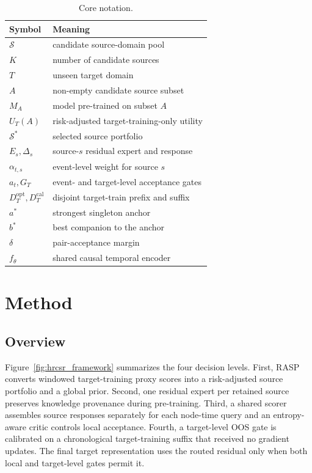 \documentclass[journal]{IEEEtran}
\begin{document}
\begin{table}[t]
\centering
\caption{Core notation.}
\label{tab:notation}
\small
\begin{tabular*}{\linewidth}{@{\extracolsep{\fill}}ll}
\toprule
Symbol & Meaning \\
\midrule
$\mathcal S$ & candidate source-domain pool \\
$K$ & number of candidate sources \\
$T$ & unseen target domain \\
$A$ & non-empty candidate source subset \\
$M_A$ & model pre-trained on subset $A$ \\
$U_T(A)$ & risk-adjusted target-training-only utility \\
$\mathcal S^*$ & selected source portfolio \\
$E_s,\Delta_s$ & source-$s$ residual expert and response \\
$\alpha_{t,s}$ & event-level weight for source $s$ \\
$a_t,G_T$ & event- and target-level acceptance gates \\
$D_T^{\mathrm{opt}},D_T^{\mathrm{cal}}$ & disjoint target-train prefix and suffix \\
$a^*$ & strongest singleton anchor \\
$b^*$ & best companion to the anchor \\
$\delta$ & pair-acceptance margin \\
$f_\theta$ & shared causal temporal encoder \\
\bottomrule
\end{tabular*}
\end{table}

\section{Method}
\subsection{Overview}
Figure~\ref{fig:hrcsr_framework} summarizes the four decision levels. First, RASP converts windowed target-training proxy scores into a risk-adjusted source portfolio and a global prior. Second, one residual expert per retained source preserves knowledge provenance during pre-training. Third, a shared scorer assembles source responses separately for each node-time query and an entropy-aware critic controls local acceptance. Fourth, a target-level OOS gate is calibrated on a chronological target-training suffix that received no gradient updates. The final target representation uses the routed residual only when both local and target-level gates permit it.
\end{document}
